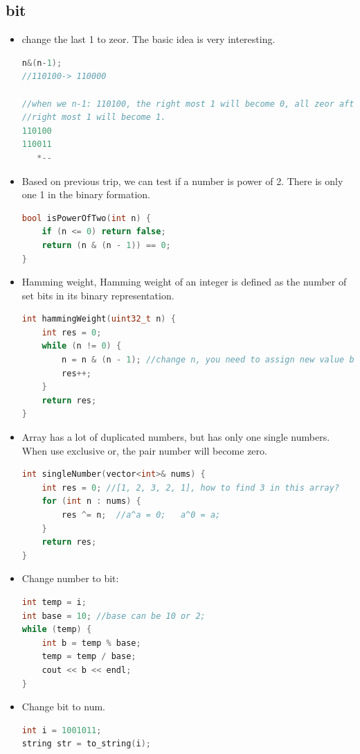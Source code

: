 \documentclass[a4paper,11pt,twoside]{book}
\begin{document}
\subsection{bit}
\begin{itemize}
	\item change the last 1 to zeor. The basic idea is very interesting. 
\begin{lstlisting}[frame=single, language=c++]	
n&(n-1);
//110100-> 110000

//when we n-1: 110100, the right most 1 will become 0, all zeor after 
//right most 1 will become 1. 
110100
110011
   *--
\end{lstlisting}

	\item Based on previous trip, we can test if a number is power of 2. There is only one 1 in the binary formation.
\begin{lstlisting}[frame=single, language=c++]	
bool isPowerOfTwo(int n) {
	if (n <= 0) return false;
	return (n & (n - 1)) == 0;
}	
\end{lstlisting}

	\item Hamming weight,  Hamming weight of an integer is defined as the number of set bits in its binary representation. 
\begin{lstlisting}[frame=single, language=c++]	
int hammingWeight(uint32_t n) {
	int res = 0;
	while (n != 0) {
		n = n & (n - 1); //change n, you need to assign new value back to n. 
		res++;
	}
	return res;
}
\end{lstlisting}
	
	\item Array has a lot of duplicated numbers, but has only one single numbers.  When use exclusive or, the pair number will become zero.
\begin{lstlisting}[frame=single, language=c++]	
int singleNumber(vector<int>& nums) {
	int res = 0; //[1, 2, 3, 2, 1], how to find 3 in this array? 
	for (int n : nums) {
		res ^= n;  //a^a = 0;   a^0 = a;
	}
	return res;
}
\end{lstlisting}

	\item Change number to bit: 
\begin{lstlisting}[frame=single, language=c++]	
int temp = i;
int base = 10; //base can be 10 or 2;
while (temp) {
	int b = temp % base;
	temp = temp / base;
	cout << b << endl;
}	
\end{lstlisting}	
	
	\item Change bit to num.
\begin{lstlisting}[frame=single, language=c++]	
int i = 1001011;
string str = to_string(i);


\end{lstlisting}
\end{itemize}
\end{document}
